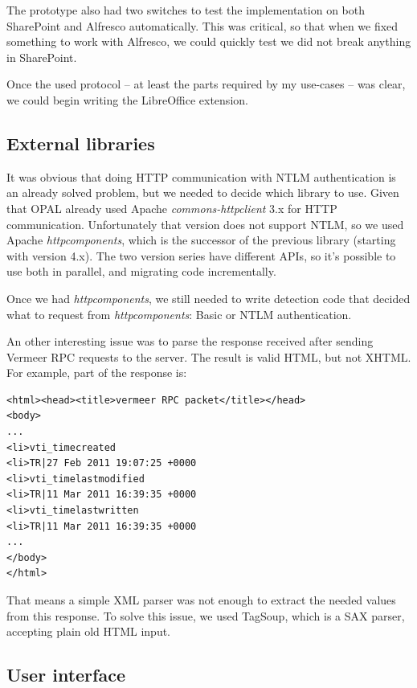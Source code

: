 The prototype also had two switches to test the implementation on both
SharePoint and Alfresco automatically. This was critical, so that when we fixed
something to work with Alfresco, we could quickly test we did not break
anything in SharePoint.

Once the used protocol -- at least the parts required by my use-cases -- was
clear, we could begin writing the LibreOffice extension.

\subsection{External libraries}

It was obvious that doing HTTP communication with NTLM authentication is an
already solved problem, but we needed to decide which library to use. Given that
OPAL already used Apache \emph{commons-httpclient}\cite{httpclient} 3.x for
HTTP communication. Unfortunately that version does not support NTLM, so we used
Apache \emph{httpcomponents}\cite{httpcomponents}, which is the successor of
the previous library (starting with version 4.x). The two version series have
different APIs, so it's possible to use both in parallel, and migrating code
incrementally.

Once we had \emph{httpcomponents}, we still needed to write detection code that
decided what to request from \emph{httpcomponents}: Basic or NTLM
authentication.

An other interesting issue was to parse the response received after sending
Vermeer RPC requests to the server. The result is valid HTML, but not XHTML.
For example, part of the response is:

\begin{lstlisting}
<html><head><title>vermeer RPC packet</title></head>
<body>
...
<li>vti_timecreated
<li>TR|27 Feb 2011 19:07:25 +0000
<li>vti_timelastmodified
<li>TR|11 Mar 2011 16:39:35 +0000
<li>vti_timelastwritten
<li>TR|11 Mar 2011 16:39:35 +0000
...
</body>
</html>\end{lstlisting}

That means a simple XML parser was not enough to extract the needed values from
this response. To solve this issue, we used TagSoup\cite{tagsoup}, which is a
SAX parser, accepting plain old HTML input.

\subsection{User interface}

